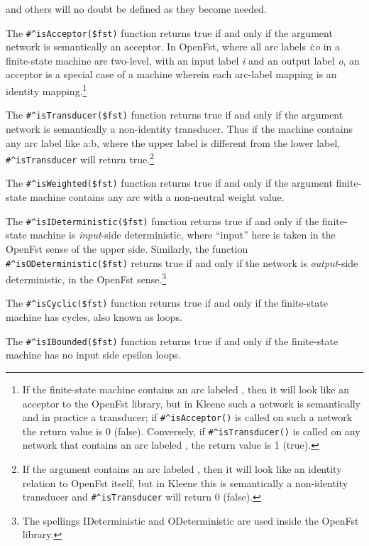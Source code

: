 \vspace{0.5cm}
\noindent
and others will no doubt be defined as they become needed.

The \verb!#^isAcceptor($fst)! function returns true if and only if the
argument network is semantically an
acceptor.  In OpenFst, where all arc labels \emph{i}:\emph{o} in a finite-state machine
are two-level, with an input label \emph{i} and an output label \emph{o}, an acceptor is a special case of a
machine wherein each arc-label mapping is an identity mapping.\footnote{If the finite-state machine contains an arc labeled
, then it will look like an acceptor to the OpenFst library, but in Kleene such
a network is semantically and in practice a transducer; if \verb!#^isAcceptor()! is called on such
a network the return value is 0 (false).  Conversely, if
\verb!#^isTransducer()! is called on any network that
contains an arc labeled , the return value is 1 (true).}

The \verb!#^isTransducer($fst)! function returns true if and only if the argument network is semantically a
non-identity transducer.  Thus if the machine contains any arc label like a:b, where the upper label is
different from the lower label, \verb!#^isTransducer! will return true.\footnote{If the argument contains an
arc labeled 
,
then it will look like an identity relation to OpenFst itself, but in
Kleene this is semantically a non-identity transducer and \verb!#^isTransducer! will return 0 (false).}

The \verb!#^isWeighted($fst)! function returns true if and only if the argument
finite-state machine contains any arc
with a non-neutral weight value.

The \verb!#^isIDeterministic($fst)! function returns true if and only if the finite-state machine is \emph{input}-side
deterministic, where ``input'' here is taken in the OpenFst sense of the upper side.
Similarly, the function \verb!#^isODeterministic($fst)! returns true if and only if the
network is \emph{output}-side deterministic, in the OpenFst sense.\footnote{The spellings IDeterministic and ODeterministic are
used inside the OpenFst library.}

The \verb!#^isCyclic($fst)! function returns true if and only if the finite-state machine has cycles, also
known as loops.

The \verb!#^isIBounded($fst)! function returns true if and only if the finite-state machine has no input side
epsilon loops.


